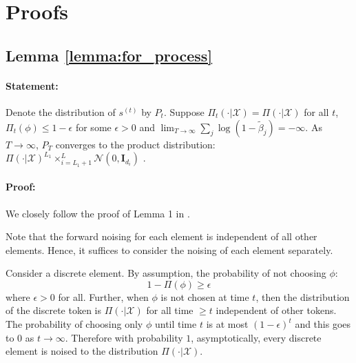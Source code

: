 \section{Proofs}

\subsection{Lemma \ref{lemma:for_process}}

\paragraph{Statement:\\}

Denote the distribution of $s^{(t)}$ by $P_t$. Suppose $\Pi_t\left(\cdot | \mathcal{X} \right) = \Pi\left(\cdot | \mathcal{X} \right)$ for all $t$, $\Pi_t(\phi) \leq 1 - \epsilon$ for some $\epsilon > 0$ and $\lim_{T \rightarrow \infty} \sum_{j} \log \left(1- \tilde{\beta}_j\right) = -\infty$. As $T \rightarrow \infty$, $P_T$ converges to the product distribution: $\Pi\left( \cdot| \mathcal{X} \right)^{L_1} \times_{i=L_1 + 1}^{L} \mathcal{N}\left(0, \mathbf{I}_{d_i} \right)$ .

\paragraph{Proof:\\}

We closely follow the proof of Lemma 1 in \cite{varma2024glauber}.

Note that the forward noising for each element is independent of all other elements.  Hence, it suffices to consider the noising of each element separately.

Consider a discrete element. By assumption, the probability of not choosing $\phi$:
$$ 1 - \Pi(\phi) \geq \epsilon  $$
where $\epsilon>0$ for all. Further, when $\phi$ is not chosen at time $t$, then the distribution of the discrete token is $\Pi( \cdot|\mathcal{X})$ for all time $\geq t$ independent of other tokens. The probability of choosing only $\phi$ until time $t$ is at most $(1-\epsilon)^t$ and this goes to $0$ as $t \rightarrow \infty $. Therefore with probability $1$, asymptotically, every discrete element is noised to the distribution $\Pi\left( \cdot| \mathcal{X} \right)$.

